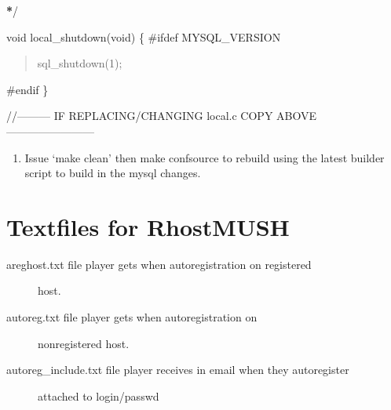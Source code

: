 \documentclass[letterpaper,10pt,english]{sphinxmanual}
\begin{document}
\begin{description}
\begin{description}
\begin{itemize}
\end{itemize}

\sphinxAtStartPar
{\color{red}\bfseries{}*}/

\end{description}

\sphinxAtStartPar
void local\_shutdown(void) \{
\#ifdef MYSQL\_VERSION
\begin{quote}

\sphinxAtStartPar
sql\_shutdown(\sphinxhyphen{}1);
\end{quote}

\sphinxAtStartPar
\#endif
\}

\end{description}

\sphinxAtStartPar
//———\textendash{} IF REPLACING/CHANGING local.c COPY ABOVE ————————\textendash{}
\begin{enumerate}
%
\setcounter{enumi}{5}
\item {} 
\sphinxAtStartPar
Issue ‘make clean’ then make confsource to rebuild using the latest
builder script to build in the mysql changes.

\end{enumerate}


\chapter{Textfiles for RhostMUSH}
\label{\detokenize{35-txtfiles:textfiles-for-rhostmush}}\label{\detokenize{35-txtfiles::doc}}\begin{description}
\item[{areghost.txt           \sphinxhyphen{} file player gets when autoregistration on registered}] \leavevmode
\sphinxAtStartPar
host.

\item[{autoreg.txt            \sphinxhyphen{} file player gets when autoregistration on}] \leavevmode
\sphinxAtStartPar
non\sphinxhyphen{}registered host.

\item[{autoreg\_include.txt    \sphinxhyphen{} file player receives in email when they autoregister}] \leavevmode
\sphinxAtStartPar
attached to login/passwd

\end{description}
\end{document}
